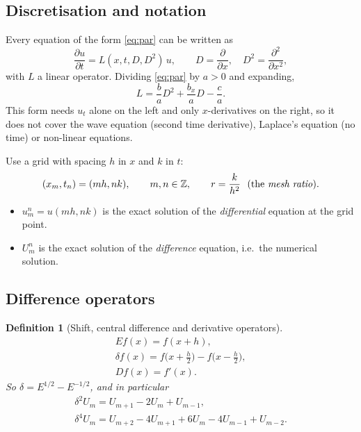 \documentclass[11pt,a4paper]{article}
\numberwithin{equation}{section}
\theoremstyle{spacedplain}
\theoremstyle{spaceddefinition}
\newtheorem{definition}[theorem]{Definition}
\theoremstyle{spacedremark}
\newcommand{\pd}[2]{\frac{\partial #1}{\partial #2}}
\newcommand{\pdd}[2]{\frac{\partial^2 #1}{\partial #2^2}}
\begin{document}
\subsection{Discretisation and notation}

Every equation of the form \eqref{eq:par} can be written as
\[
  \pd ut=L(x,t,D,D^2)\,u,
  \qquad D=\pd{}{x},\quad D^2=\pdd{}{x},
\]
with \(L\) a linear operator.  Dividing \eqref{eq:par} by \(a>0\) and
expanding,
\[
  L=\frac ba D^2+\frac{b_x}{a}D-\frac ca .
\]
This form needs \(u_t\) alone on the left and only \(x\)-derivatives on
the right, so it does not cover the wave equation (second time
derivative), Laplace's equation (no time) or non-linear equations.

Use a grid with spacing \(h\) in \(x\) and \(k\) in \(t\):
\[
  (x_m,t_n)=(mh,nk),\qquad m,n\in\mathbb Z,
  \qquad r=\frac{k}{h^2}\ \text{ (the \emph{mesh ratio})}.
\]
\begin{itemize}
  \item \(u_m^n=u(mh,nk)\) is the exact solution of the
    \emph{differential} equation at the grid point.
  \item \(U_m^n\) is the exact solution of the \emph{difference}
    equation, i.e.\ the numerical solution.
\end{itemize}

\begin{center}
\end{center}

\subsection{Difference operators}

\begin{definition}[Shift, central difference and derivative operators]
\[
\begin{gathered}
  E f(x)=f(x+h),
  \\
  \delta f(x)=f\bigl(x+\tfrac h2\bigr)-f\bigl(x-\tfrac h2\bigr),
  \\
  Df(x)=f'(x).
\end{gathered}
\]
So \(\delta=E^{1/2}-E^{-1/2}\), and in particular
\[
\begin{gathered}
  \delta^2U_m=U_{m+1}-2U_m+U_{m-1},
  \\
  \delta^4U_m=U_{m+2}-4U_{m+1}+6U_m-4U_{m-1}+U_{m-2}.
\end{gathered}
\]
\end{definition}
\end{document}
